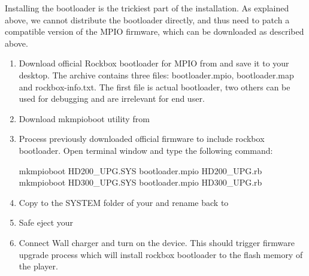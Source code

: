
  Installing the bootloader is the trickiest part of the installation.
  As explained above, we cannot distribute the bootloader directly, and
  thus need to patch a compatible version of the MPIO firmware, which
  can be downloaded as described above.


\begin{enumerate}
   \item Download official Rockbox bootloader for MPIO \playertype{} from
   and save it to your desktop. The archive contains three files: bootloader.mpio, 
   bootloader.map and rockbox-info.txt. The first file is actual bootloader, two
   others can be used for debugging and are irrelevant for end user.
   \item Download mkmpioboot utility from 
   \item Process previously downloaded official firmware to include rockbox bootloader.
   Open terminal window and type the following command:
     \begin{code}[firstline=\opt{mpiohd200}{1}\opt{mpiohd300}{2},
                  lastline=\opt{mpiohd200}{1}\opt{mpiohd300}{2}]
       mkmpioboot HD200_UPG.SYS bootloader.mpio HD200_UPG.rb
       mkmpioboot HD300_UPG.SYS bootloader.mpio HD300_UPG.rb
     \end{code}
   \item Copy %
   to the SYSTEM folder of your \dap{} and rename back to
   \item Safe eject your \dap{}
   \item Connect Wall charger and turn on the device. This should trigger firmware
   upgrade process which will install rockbox bootloader to the flash memory of the
   player.
\end{enumerate}
